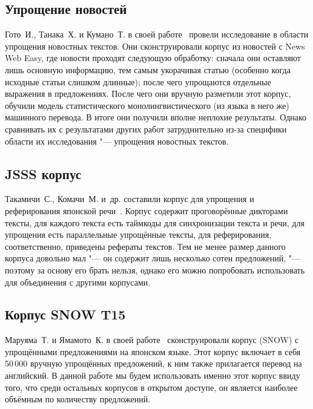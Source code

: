 \subsection{Упрощение новостей}


Гото~И., Танака~Х. и Кумано~Т. в своей работе~\cite{newsSimplification} провели исследование в области упрощения новостных текстов.
Они сконструировали корпус из новостей с News Web Easy, где новости проходят следующую обработку: сначала они оставляют лишь основную информацию, тем самым укорачивая статью (особенно когда исходные статьи слишком длинные); после чего упрощаются отдельные выражения в предложениях. После чего они вручную разметили этот корпус, обучили модель статистического монолингвистического (из языка в него же) машинного перевода. В итоге они получили вполне неплохие результаты. Однако сравнивать их с результатами других работ затруднительно из-за специфики области их исследования "--- упрощения новостных текстов.


\subsection{JSSS корпус}


Такамичи~С., Комачи~М. и~др. составили корпус для упрощения и реферирования японской речи~\cite{takamichi2020jsss}.
Корпус содержит проговорённые дикторами тексты, для каждого текста есть таймкоды для синхронизации текста и речи, для упрощения есть параллельные упрощённые тексты, для реферирования, соответственно, приведены рефераты текстов.
Тем не менее размер данного корпуса довольно мал "--- он содержит лишь несколько сотен предложений, "--- поэтому за основу его брать нельзя, однако его можно попробовать использовать для объединения с другими корпусами.


\subsection{Корпус SNOW T15}


Маруяма~Т. и Ямамото~К. в своей работе~\cite{snow-dataset} сконструировали корпус (SNOW) с упрощёнными предложениями на японском языке.
Этот корпус включает в себя 50\,000 вручную упрощённых предложений, к ним также прилагается перевод на английский.
В данной работе мы будем использовать именно этот корпус ввиду того, что среди остальных корпусов в открытом доступе, он является наиболее объёмным по количеству предложений.


